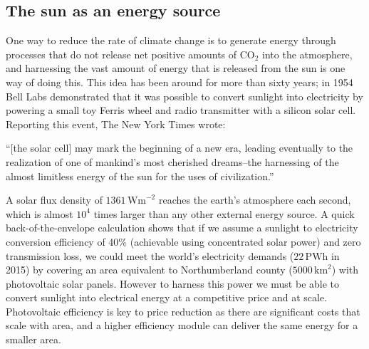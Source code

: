 


\subsection{The sun as an energy source}
One way to reduce the rate of climate change is to generate energy through processes that do not release net positive amounts of CO$_2$ into the atmosphere, and harnessing the vast amount of energy that is released from the sun is one way of doing this. This idea has been around for more than sixty years; in 1954 Bell Labs demonstrated that it was possible to convert sunlight into electricity by powering a small toy Ferris wheel and radio transmitter with a silicon solar cell. Reporting this event, The New York Times wrote:
\begin{displayquote}
“[the solar cell] may mark the beginning of a new era, leading eventually to the realization of one of mankind’s most cherished dreams–the harnessing of the almost limitless energy of the sun for the uses of civilization.”
\end{displayquote}
A solar flux density of $1361\,\textrm{Wm}^{-2}$ reaches the earth's atmosphere each second, which is almost $10^4$ times larger than any other external energy source.\autocite{Kopp2011} A quick back-of-the-envelope calculation shows that if we assume a sunlight to electricity conversion efficiency of 40\% (achievable using concentrated solar power) and zero transmission loss, we could meet the world's electricity demands ($22\,\textrm{PWh}$ in 2015\autocite{IEA2017}) by covering an area equivalent to Northumberland county ($5000\,\textrm{km}^2$) with photovoltaic solar panels.
%
However to harness this power we must be able to convert sunlight into electrical energy at a competitive price and at scale. Photovoltaic efficiency is key to price reduction as there are significant costs that scale with area,\autocite{Fraunhofer2015,Green2016} and a higher efficiency module can deliver the same energy for a smaller area.

